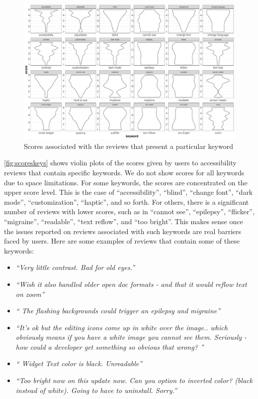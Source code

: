  \begin{figure}[!htb]
 \centering
\includegraphics[scale=0.42]{imagens/keywords-scores.pdf}
\caption{Scores associated with the reviews that present a particular keyword}
\label{fig:scoreskeys}
\end{figure}

\autoref{fig:scoreskeys} shows violin plots of the scores given by users to accessibility reviews that contain specific keywords. We do not show scores for all keywords due to space limitations. 
For some keywords, the scores are concentrated on the upper score level. This is the case of ``accessibility'', ``blind'', ``change font'', ``dark mode'', ``customization'', ``haptic'', and so forth. 
For others, there is a significant number of reviews with lower scores, such as in ``cannot see'', ``epilepsy'', ``flicker'', ``migraine'', ``readable'', ``text reflow'', and ``too bright''. This makes sense once the issues reported on reviews associated with such keywords are real barriers faced by users. Here are some examples of reviews that contain some of these keywords:
\begin{itemize}
 \item \textit{``Very little contrast. Bad for old eyes.''}
 \item \textit{``Wish it also handled older open doc formats - and that it would reflow text on zoom''}
 \item \textit{`` The flashing backgrounds could trigger an epilepsy and migraine''}
 \item \textit{``It's ok but the editing icons come up in white over the image.. which obviously means if you have a white image you cannot see them. Seriously - how could a developer get something so obvious that wrong? ''}
 \item \textit{`` Widget Text color is black. Unreadable''}
 \item \textit{``Too bright now on this update now. Can you option to inverted color? (black instead of white). Going to have to uninstall. Sorry.''}  
\end{itemize}



